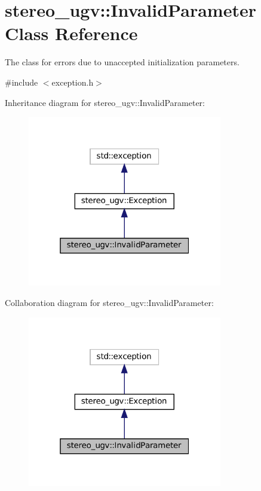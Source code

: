 \hypertarget{classstereo__ugv_1_1InvalidParameter}{}\section{stereo\+\_\+ugv\+:\+:Invalid\+Parameter Class Reference}
\label{classstereo__ugv_1_1InvalidParameter}


The class for errors due to unaccepted initialization parameters.  




{\ttfamily \#include $<$exception.\+h$>$}



Inheritance diagram for stereo\+\_\+ugv\+:\+:Invalid\+Parameter\+:
\nopagebreak
\begin{figure}[H]
\begin{center}
\leavevmode
\includegraphics[width=241pt]{classstereo__ugv_1_1InvalidParameter__inherit__graph}
\end{center}
\end{figure}


Collaboration diagram for stereo\+\_\+ugv\+:\+:Invalid\+Parameter\+:
\nopagebreak
\begin{figure}[H]
\begin{center}
\leavevmode
\includegraphics[width=241pt]{classstereo__ugv_1_1InvalidParameter__coll__graph}
\end{center}
\end{figure}
